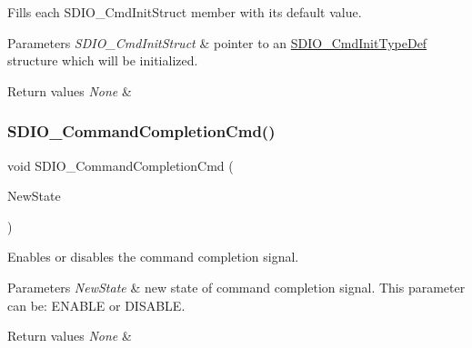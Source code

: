 Fills each S\+D\+I\+O\+\_\+\+Cmd\+Init\+Struct member with its default value. 


\begin{DoxyParams}{Parameters}
{\em S\+D\+I\+O\+\_\+\+Cmd\+Init\+Struct} & pointer to an \mbox{\hyperlink{struct_s_d_i_o___cmd_init_type_def}{S\+D\+I\+O\+\_\+\+Cmd\+Init\+Type\+Def}} structure which will be initialized. \\
\hline
\end{DoxyParams}

\begin{DoxyRetVals}{Return values}
{\em None} & \\
\hline
\end{DoxyRetVals}
\mbox{\label{group___s_d_i_o___exported___functions_ga1bbe98c629812bc62121d9c8b2c5e21b}} 
\subsubsection{\texorpdfstring{SDIO\_CommandCompletionCmd()}{SDIO\_CommandCompletionCmd()}}
{\footnotesize\ttfamily void S\+D\+I\+O\+\_\+\+Command\+Completion\+Cmd (\begin{DoxyParamCaption}\item[{\mbox{\hyperlink{group___exported__types_gac9a7e9a35d2513ec15c3b537aaa4fba1}{Functional\+State}}}]{New\+State }\end{DoxyParamCaption})}



Enables or disables the command completion signal. 


\begin{DoxyParams}{Parameters}
{\em New\+State} & new state of command completion signal. This parameter can be\+: E\+N\+A\+B\+LE or D\+I\+S\+A\+B\+LE. \\
\hline
\end{DoxyParams}

\begin{DoxyRetVals}{Return values}
{\em None} & \\
\hline
\end{DoxyRetVals}
\mbox{\label{group___s_d_i_o___exported___functions_gad65d896ae919683585bda44a1e2afae4}} 
